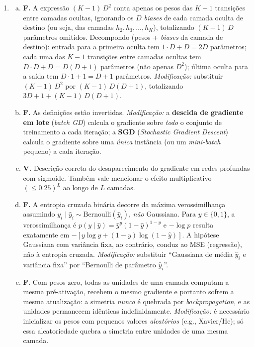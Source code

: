 \documentclass{dlproblemset}
\begin{document}
\begin{enumerate}[1)]
    \item
    \begin{enumerate}[a)]
        \item \textbf{F.} A expressão $(K - 1)\,D^2$ conta apenas os pesos das $K - 1$ transições entre camadas ocultas, ignorando os $D$ \textit{biases} de cada camada oculta de destino (ou seja, das camadas $h_2, h_3, \ldots, h_K$), totalizando $(K - 1)\,D$ parâmetros omitidos. Decompondo (pesos + \textit{biases} da camada de destino): entrada para a primeira oculta tem $1 \cdot D + D = 2D$ parâmetros; cada uma das $K - 1$ transições entre camadas ocultas tem $D \cdot D + D = D(D+1)$ parâmetros (não apenas $D^2$); última oculta para a saída tem $D \cdot 1 + 1 = D + 1$ parâmetros. \textit{Modificação:} substituir $(K - 1)\,D^2$ por $(K - 1)\,D(D+1)$, totalizando $3D + 1 + (K - 1)\,D(D+1)$.
        \item \textbf{F.} As definições estão invertidas. \textit{Modificação:} a \textbf{descida de gradiente em lote} (\textit{batch GD}) calcula o gradiente sobre \emph{todo} o conjunto de treinamento a cada iteração; a \textbf{SGD} (\textit{Stochastic Gradient Descent}) calcula o gradiente sobre uma \emph{única} instância (ou um \textit{mini-batch} pequeno) a cada iteração.
        \item \textbf{V.} Descrição correta do desaparecimento do gradiente em redes profundas com sigmoide. Também vale mencionar o efeito multiplicativo $(\le 0.25)^L$ ao longo de $L$ camadas.
        \item \textbf{F.} A entropia cruzada binária decorre da máxima verossimilhança assumindo $y_i \mid \hat{y}_i \sim \mathrm{Bernoulli}(\hat{y}_i)$, \emph{não} Gaussiana. Para $y \in \{0,1\}$, a verossimilhança é $p(y \mid \hat{y}) = \hat{y}^{y}(1-\hat{y})^{1-y}$ e $-\log p$ resulta exatamente em $-[y\log \hat{y} + (1-y)\log(1-\hat{y})]$. A hipótese Gaussiana com variância fixa, ao contrário, conduz ao MSE (regressão), não à entropia cruzada. \textit{Modificação:} substituir ``Gaussiana de média $\hat{y}_i$ e variância fixa'' por ``Bernoulli de parâmetro $\hat{y}_i$''.
        \item \textbf{F.} Com pesos zero, todas as unidades de uma camada computam a mesma pré-ativação, recebem o mesmo gradiente e portanto sofrem a mesma atualização: a simetria \emph{nunca} é quebrada por \textit{backpropagation}, e as unidades permanecem idênticas indefinidamente. \textit{Modificação:} é necessário inicializar os pesos com pequenos valores \emph{aleatórios} (e.g., Xavier/He); só essa aleatoriedade quebra a simetria entre unidades de uma mesma camada.
    \end{enumerate}


\end{enumerate}
\end{document}
